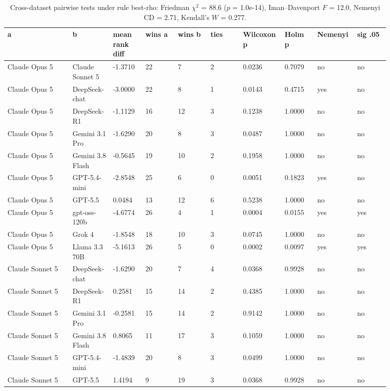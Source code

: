 \begin{landscape}
\tiny
\setlength{\tabcolsep}{3pt}
\begin{longtable}{p{0.162\linewidth}p{0.081\linewidth}p{0.081\linewidth}p{0.081\linewidth}p{0.081\linewidth}p{0.081\linewidth}p{0.081\linewidth}p{0.081\linewidth}p{0.081\linewidth}p{0.081\linewidth}}
\caption{Cross-dataset pairwise tests under rule best-rho: Friedman $\chi^2$ = 88.6 ($p$ = 1.0e-14), Iman--Davenport $F$ = 12.0, Nemenyi CD = 2.71, Kendall's $W$ = 0.277.}\label{tab:pairwise_best_anchor}\\
\toprule
a & b & mean rank diff & wins a & wins b & ties & Wilcoxon p & Holm p & Nemenyi & sig .05 \\
\midrule
Claude Opus 5 & Claude Sonnet 5 & -1.3710 & 22 & 7 & 2 & 0.0236 & 0.7079 & no & no \\
Claude Opus 5 & DeepSeek-chat & -3.0000 & 22 & 8 & 1 & 0.0143 & 0.4715 & yes & no \\
Claude Opus 5 & DeepSeek-R1 & -1.1129 & 16 & 12 & 3 & 0.1238 & 1.0000 & no & no \\
Claude Opus 5 & Gemini 3.1 Pro & -1.6290 & 20 & 8 & 3 & 0.0487 & 1.0000 & no & no \\
Claude Opus 5 & Gemini 3.8 Flash & -0.5645 & 19 & 10 & 2 & 0.1958 & 1.0000 & no & no \\
Claude Opus 5 & GPT-5.4-mini & -2.8548 & 25 & 6 & 0 & 0.0051 & 0.1823 & yes & no \\
Claude Opus 5 & GPT-5.5 & 0.0484 & 13 & 12 & 6 & 0.5238 & 1.0000 & no & no \\
Claude Opus 5 & gpt-oss-120b & -4.6774 & 26 & 4 & 1 & 0.0004 & 0.0155 & yes & yes \\
Claude Opus 5 & Grok 4 & -1.8548 & 18 & 10 & 3 & 0.0745 & 1.0000 & no & no \\
Claude Opus 5 & Llama 3.3 70B & -5.1613 & 26 & 5 & 0 & 0.0002 & 0.0097 & yes & yes \\
Claude Sonnet 5 & DeepSeek-chat & -1.6290 & 20 & 7 & 4 & 0.0368 & 0.9928 & no & no \\
Claude Sonnet 5 & DeepSeek-R1 & 0.2581 & 15 & 14 & 2 & 0.4385 & 1.0000 & no & no \\
Claude Sonnet 5 & Gemini 3.1 Pro & -0.2581 & 15 & 14 & 2 & 0.9142 & 1.0000 & no & no \\
Claude Sonnet 5 & Gemini 3.8 Flash & 0.8065 & 11 & 17 & 3 & 0.1059 & 1.0000 & no & no \\
Claude Sonnet 5 & GPT-5.4-mini & -1.4839 & 20 & 8 & 3 & 0.0499 & 1.0000 & no & no \\
Claude Sonnet 5 & GPT-5.5 & 1.4194 & 9 & 19 & 3 & 0.0368 & 0.9928 & no & no \\

\end{longtable}
\end{landscape}
